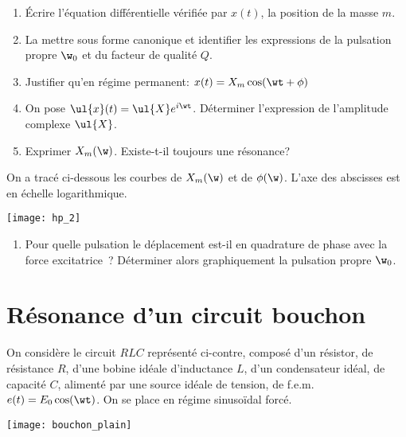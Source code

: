 \documentclass[a4paper, 12pt, final, garamond]{book}
\begin{document}
\begin{enumerate}
    \item Écrire l'équation différentielle vérifiée par $x(t)$, la position de
        la masse $m$.
    \item La mettre sous forme canonique et identifier les expressions de la
        pulsation propre $\w_0$ et du facteur de qualité $Q$.
    \item Justifier qu'en régime permanent: $x(t) = X_m \cos(\wt + \phi)$
    \item On pose $\ul{x}(t) = \ul{X}e^{i\wt}$. Déterminer
        l'expression de l'amplitude complexe $\ul{X}$.
    \item Exprimer $X_m(\w)$. Existe-t-il toujours une résonance?
\end{enumerate}

On a tracé ci-dessous les courbes de $X_m (\w)$ et de
$\phi(\w)$. L'axe des abscisses est en échelle logarithmique.

\begin{center}
    \texttt{[image: hp\_2]}
\end{center}

\begin{enumerate}[start=6]
    \item Pour quelle pulsation le déplacement est-il en quadrature de phase
        avec la force excitatrice~? Déterminer alors graphiquement la pulsation
        propre $\w_0$.
\end{enumerate}

\section{Résonance d'un circuit bouchon}

\begin{minipage}{0.55\linewidth}
    
On considère le circuit $RLC$ représenté ci-contre, composé d'un
résistor, de résistance $R$, d'une bobine idéale d'inductance $L$,
d'un condensateur idéal, de capacité $C$, alimenté par une source
idéale de tension, de f.e.m. $e(t)=E_0\cos(\wt)$. On se place en
régime sinusoïdal forcé.
\end{minipage}
\hfill
\begin{minipage}{0.45\linewidth}
    \begin{center}
        \texttt{[image: bouchon\_plain]}
    \end{center}
\end{minipage}
\end{document}
